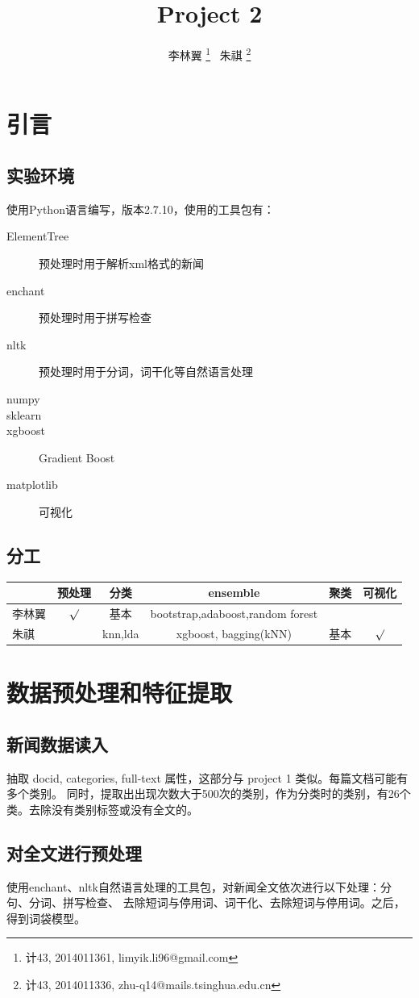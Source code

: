 \documentclass[12pt]{article}
\title{Project 2}
\author{
李林翼 \footnote{计43, 2014011361, limyik.li96@gmail.com}
\ 朱祺 \footnote{计43, 2014011336, zhu-q14@mails.tsinghua.edu.cn}
}
\begin{document}
\maketitle{}
\tableofcontents
\newpage

\section{引言}
\subsection{实验环境}
使用Python语言编写，版本2.7.10，使用的工具包有：
\begin{description}
  \item[ElementTree]
  预处理时用于解析xml格式的新闻
  \item[enchant]
  预处理时用于拼写检查
  \item[nltk]
  预处理时用于分词，词干化等自然语言处理
  \item[numpy]
  \item[sklearn]
  \item[xgboost]
  Gradient Boost
  \item[matplotlib]
  可视化
\end{description}
\subsection{分工}
\begin{tabular}{l|c|c|c|c|c}
  \hline
   &预处理&分类&ensemble&聚类&可视化\\
  \hline
  李林翼&${\surd}$&基本&bootstrap,adaboost,random forest& &\\
  \hline
  朱祺&&knn,lda&xgboost, bagging(kNN)&基本&${\surd}$\\
  \hline
\end{tabular}

\section{数据预处理和特征提取}
\subsection{新闻数据读入}
抽取 docid, categories, full-text 属性，这部分与 project 1 类似。每篇文档可能有多个类别。
同时，提取出出现次数大于500次的类别，作为分类时的类别，有26个类。去除没有类别标签或没有全文的。
\subsection{对全文进行预处理}
使用enchant、nltk自然语言处理的工具包，对新闻全文依次进行以下处理：分句、分词、拼写检查、
去除短词与停用词、词干化、去除短词与停用词。之后，得到词袋模型。
\end{document}
